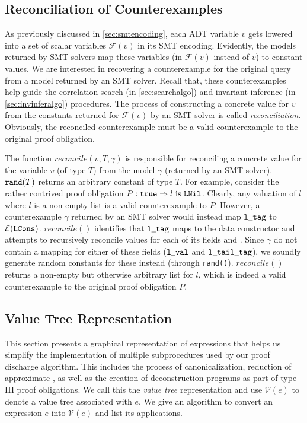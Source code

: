 \subsection{Reconciliation of Counterexamples}
\label{sec:cerecons}
As previously discussed in \cref{sec:smtencoding}, each ADT variable $v$ gets lowered into a set of scalar
variables $\mathcal{F}(v)$ in its SMT encoding.
Evidently, the models returned by SMT solvers map these variables (in $\mathcal{F}(v)$ instead of $v$)
to constant values.
We are interested in recovering a counterexample for the original query from a
model returned by an SMT solver.
Recall that, these counterexamples help guide the correlation search (in \cref{sec:searchalgo})
and invariant inference (in \cref{sec:invinferalgo}) procedures.
The process of constructing a concrete value for $v$ from the constants returned for $\mathcal{F}(v)$
by an SMT solver is called {\em reconciliation}.
Obviously, the reconciled counterexample must be a valid counterexample to the original proof obligation.

The function $reconcile(v, T, \gamma)$ is responsible for reconciling a concrete value for the variable $v$ (of type $T$)
from the model $\gamma$ (returned by an SMT solver).
${\tt rand}(T)$ returns an arbitrary constant of type $T$.
For example, consider the rather contrived proof obligation $P: {\tt true} \Rightarrow l\ \mathrm{is}\ {\tt {\tt LNil}}$.
Clearly, any valuation of $l$ where $l$ is a non-empty list is a valid counterexample to $P$.
However, a counterexample $\gamma$ returned by an SMT solver would instead
map ${\tt l \strsep{} tag}$ to $\mathcal{E}({\tt LCons})$.
$reconcile()$ identifies that ${\tt l \strsep{} tag}$ maps to the data constructor 
and attempts to recursively reconcile values for each of its fields  and .
Since $\gamma$ do not contain a mapping for either of these fields (${\tt l \strsep{} val}$ and ${\tt l \strsep{} tail \strsep{} tag}$),
we soundly generate random constants for these instead (through {\tt rand()}).
$reconcile()$ returns a non-empty but otherwise arbitrary list for $l$,
which is indeed a valid counterexample to the original proof obligation $P$.

\subsection{Value Tree Representation}
\label{sec:valuegraph}
This section presents a graphical representation of expressions that helps us simplify the
implementation of multiple subprocedures used by our proof discharge algorithm.
This includes the process of canonicalization, reduction of approximate \recursiveRelations{}, as well as
the creation of deconstruction programs as part of type III proof obligations.
We call this the {\em value tree} representation and use $\mathcal{V}(e)$ to denote a value tree associated with $e$.
We give an algorithm to convert an expression $e$ into $\mathcal{V}(e)$ and list its applications.

